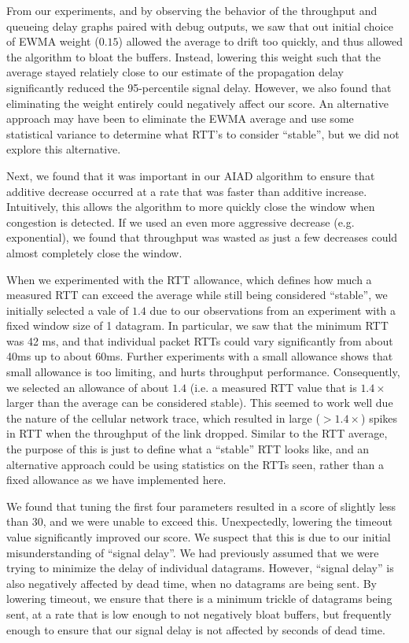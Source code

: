 \documentclass[twoside]{article}
\begin{document}
From our experiments, and by observing the behavior of the throughput and
queueing delay graphs paired with debug outputs, we saw that out initial
choice of EWMA weight ($0.15$) allowed the average to drift too quickly, and
thus allowed the algorithm to bloat the buffers. Instead, lowering this weight
such that the average stayed relatiely close to our estimate of the propagation
delay significantly reduced the 95-percentile signal delay. However, we also
found that eliminating the weight entirely could negatively affect our score.
An alternative approach may have been to eliminate the EWMA average and use
some statistical variance to determine what RTT's to consider ``stable'', but
we did not explore this alternative.

Next, we found that it was important in our AIAD algorithm to ensure that
additive decrease occurred at a rate that was faster than additive increase.
Intuitively, this allows the algorithm to more quickly close the window when
congestion is detected. If we used an even more aggressive decrease (e.g.
exponential), we found that throughput was wasted as just a few decreases could
almost completely close the window.

When we experimented with the RTT allowance, which defines how much a measured
RTT can exceed the average while still being considered ``stable'', we initially
selected a vale of $1.4$ due to our observations from an experiment with a
fixed window size of 1 datagram. In particular, we saw that the minimum RTT was
42 ms, and that individual packet RTTs could vary significantly from about 40ms
up to about 60ms. Further experiments with a small allowance shows that small
allowance is too limiting, and hurts throughput performance. Consequently, we
selected an allowance of about $1.4$ (i.e. a measured RTT value that is $1.4\times$
larger than the average can be considered stable). This seemed to work well due
the nature of the cellular network trace, which resulted in large ($>1.4\times$)
spikes in RTT when the throughput of the link dropped. Similar to the RTT
average, the purpose of this is just to define what a ``stable'' RTT looks like,
and an alternative approach could be using statistics on the RTTs seen, rather
than a fixed allowance as we have implemented here.

We found that tuning the first four parameters resulted in a score of slightly
less than 30, and we were unable to exceed this. Unexpectedly, lowering the
timeout value significantly improved our score. We suspect that this is due to
our initial misunderstanding of ``signal delay''. We had previously assumed
that we were trying to minimize the delay of individual datagrams. However,
``signal delay'' is also negatively affected by dead time, when no datagrams
are being sent. By lowering timeout, we ensure that there is a minimum trickle
of datagrams being sent, at a rate that is low enough to not negatively bloat
buffers, but frequently enough to ensure that our signal delay is not affected
by seconds of dead time.
\end{document}
